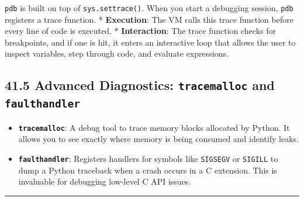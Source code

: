 \passthrough{\lstinline!pdb!} is built on top of
\passthrough{\lstinline!sys.settrace()!}. When you start a debugging
session, \passthrough{\lstinline!pdb!} registers a trace function. *
\textbf{Execution}: The VM calls this trace function before every line
of code is executed. * \textbf{Interaction}: The trace function checks
for breakpoints, and if one is hit, it enters an interactive loop that
allows the user to inspect variables, step through code, and evaluate
expressions.

\hypertarget{advanced-diagnostics-tracemalloc-and-faulthandler}{%
\subsection{\texorpdfstring{41.5 Advanced Diagnostics:
\texttt{tracemalloc} and
\texttt{faulthandler}}{41.5 Advanced Diagnostics: tracemalloc and faulthandler}}\label{advanced-diagnostics-tracemalloc-and-faulthandler}}

\begin{itemize}
\tightlist
\item
  \textbf{\passthrough{\lstinline!tracemalloc!}}: A debug tool to trace
  memory blocks allocated by Python. It allows you to see exactly where
  memory is being consumed and identify leaks.
\item
  \textbf{\passthrough{\lstinline!faulthandler!}}: Registers handlers
  for symbols like \passthrough{\lstinline!SIGSEGV!} or
  \passthrough{\lstinline!SIGILL!} to dump a Python traceback when a
  crash occurs in a C extension. This is invaluable for debugging
  low-level C API issues.
\end{itemize}

\begin{center}\rule{0.5\linewidth}{0.5pt}\end{center}
